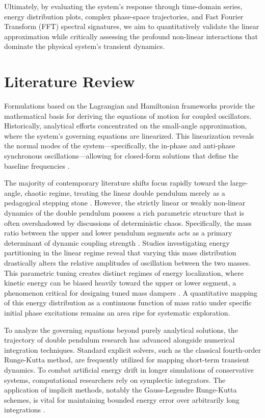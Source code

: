 \documentclass[12pt, a4paper, twoside]{article}
\begin{document}
Ultimately, by evaluating the system’s response through time-domain series, energy distribution plots, complex phase-space trajectories, and Fast Fourier Transform (FFT) spectral signatures, we aim to quantitatively validate the linear approximation while critically assessing the profound non-linear interactions that dominate the physical system's transient dynamics.

\section{Literature Review}

Formulations based on the Lagrangian and Hamiltonian frameworks \cite{goldstein2002classical} provide the mathematical basis for deriving the equations of motion for coupled oscillators. Historically, analytical efforts concentrated on the small-angle approximation, where the system's governing equations are linearized. This linearization reveals the normal modes of the system—specifically, the in-phase and anti-phase synchronous oscillations—allowing for closed-form solutions that define the baseline frequencies \cite{landau1976mechanics}. 

The majority of contemporary literature shifts focus rapidly toward the large-angle, chaotic regime, treating the linear double pendulum merely as a pedagogical stepping stone \cite{shinbrot1992chaos}. However, the strictly linear or weakly non-linear dynamics of the double pendulum possess a rich parametric structure that is often overshadowed by discussions of deterministic chaos. Specifically, the mass ratio between the upper and lower pendulum segments acts as a primary determinant of dynamic coupling strength \cite{ohlhoff2000forces}. Studies investigating energy partitioning in the linear regime reveal that varying this mass distribution drastically alters the relative amplitudes of oscillation between the two masses. This parametric tuning creates distinct regimes of energy localization, where kinetic energy can be biased heavily toward the upper or lower segment, a phenomenon critical for designing tuned mass dampers \cite{strogatz2018nonlinear}. A quantitative mapping of this energy distribution as a continuous function of mass ratio under specific initial phase excitations remains an area ripe for systematic exploration.

To analyze the governing equations beyond purely analytical solutions, the trajectory of double pendulum research has advanced alongside numerical integration techniques. Standard explicit solvers, such as the classical fourth-order Runge-Kutta method, are frequently utilized for mapping short-term transient dynamics. To combat artificial energy drift in longer simulations of conservative systems, computational researchers rely on symplectic integrators. The application of implicit methods, notably the Gauss-Legendre Runge-Kutta schemes, is vital for maintaining bounded energy error over arbitrarily long integrations \cite{hairer2006geometric}. 
\end{document}
